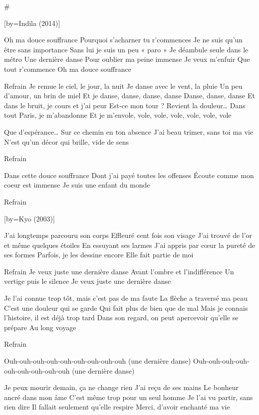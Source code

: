 # 

[by={Indila (2014)}]

\beginverse
Oh ma douce souffrance
Pourquoi s’acharner tu r’commences
Je ne suis qu’un être sans importance
Sans lui je suis un peu « paro »
Je déambule seule dans le métro
Une dernière danse
Pour oublier ma peine immense
Je veux m’enfuir
Que tout r’commence
Oh ma douce souffrance
\endverse

\beginverse
Refrain
Je remue le ciel, le jour, la nuit
Je danse avec le vent, la pluie
Un peu d’amour, un brin de miel
Et je danse, danse, danse, danse
Danse, danse, danse
Et dans le bruit, je cours et j’ai peur
Est-ce mon tour ?
Revient la douleur…
Dans tout Paris, je m’abandonne
Et je m’envole, vole, vole, vole, vole, vole, vole
\endverse

\beginverse
Que d’espérance…
Sur ce chemin en ton absence
J’ai beau trimer, sans toi ma vie
N’est qu’un décor qui brille, vide de sens
\endverse

\beginverse
Refrain
\endverse

\beginverse
Dans cette douce souffrance
Dont j’ai payé toutes les offenses
Écoute comme mon coeur est immense
Je suis une enfant du monde
\endverse

\beginverse
Refrain
\endverse

[by={Kyo (2003)}]

\beginverse
J'ai longtemps parcouru son corps
Effleuré cent fois son visage
J'ai trouvé de l'or et même quelques étoiles
En essuyant ses larmes
J'ai appris par cœur la pureté de ses formes
Parfois, je les dessine encore
Elle fait partie de moi
\endverse

\beginverse
Refrain
Je veux juste une dernière danse
Avant l'ombre et l'indifférence
Un vertige puis le silence
Je veux juste une dernière danse
\endverse

\beginverse
Je l'ai connue trop tôt, mais c'est pas de ma faute
La flèche a traversé ma peau
C'est une douleur qui se garde
Qui fait plus de bien que de mal
Mais je connais l'histoire, il est déjà trop tard
Dans son regard, on peut apercevoir qu'elle se prépare
Au long voyage
\endverse

\beginverse
Refrain
\endverse

\beginverse
Ouh-ouh-ouh-ouh-ouh-ouh-ouh-ouh-ouh (une dernière danse)
Ouh-ouh-ouh-ouh-ouh-ouh-ouh-ouh-ouh (une dernière danse)
\endverse

\beginverse
Je peux mourir demain, ça ne change rien
J'ai reçu de ses mains
Le bonheur ancré dans mon âme
C'est même trop pour un seul homme
Je l'ai vu partir, sans rien dire
Il fallait seulement qu'elle respire
Merci, d'avoir enchanté ma vie
\endverse

